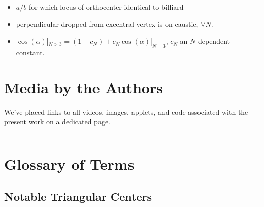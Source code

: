 \documentclass[]{article}
\providecommand{\tightlist}{%
  \setlength{\itemsep}{0pt}\setlength{\parskip}{0pt}}
\begin{document}
\begin{itemize}
\tightlist
\item
  \(a/b\) for which locus of orthocenter identical to billiard
\item
  perpendicular dropped from excentral vertex is on caustic, \(\forall N\).
\item
  \(\cos(\alpha)|_{N>3} = (1-c_N)+c_N\cos(\alpha)|_{N=3}\), \(c_N\) an \(N\)-dependent constant.
\end{itemize}

\hypertarget{media-by-the-authors}{%
\section{Media by the Authors}\label{media-by-the-authors}}

We've placed links to all videos, images, applets, and code associated with the present work on a \href{videos.html}{dedicated page}.

\begin{center}\rule{0.5\linewidth}{\linethickness}\end{center}

\hypertarget{glossary-of-terms}{%
\section{Glossary of Terms}\label{glossary-of-terms}}

\hypertarget{notable-triangular-centers}{%
\subsection{Notable Triangular Centers}\label{notable-triangular-centers}}
\end{document}

